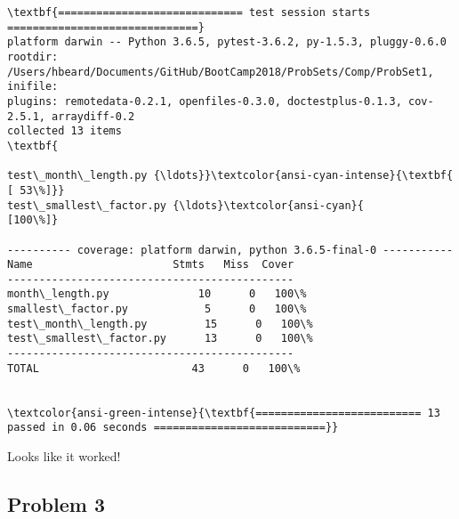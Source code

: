 \documentclass[11pt]{article}
\begin{document}
    \begin{Verbatim}[commandchars=\\\{\}]
\textbf{============================= test session starts ==============================}
platform darwin -- Python 3.6.5, pytest-3.6.2, py-1.5.3, pluggy-0.6.0
rootdir: /Users/hbeard/Documents/GitHub/BootCamp2018/ProbSets/Comp/ProbSet1, inifile:
plugins: remotedata-0.2.1, openfiles-0.3.0, doctestplus-0.1.3, cov-2.5.1, arraydiff-0.2
collected 13 items                                                             \textbf{

test\_month\_length.py {\ldots}}\textcolor{ansi-cyan-intense}{\textbf{                                             [ 53\%]}}
test\_smallest\_factor.py {\ldots}\textcolor{ansi-cyan}{                                           [100\%]}

---------- coverage: platform darwin, python 3.6.5-final-0 -----------
Name                      Stmts   Miss  Cover
---------------------------------------------
month\_length.py              10      0   100\%
smallest\_factor.py            5      0   100\%
test\_month\_length.py         15      0   100\%
test\_smallest\_factor.py      13      0   100\%
---------------------------------------------
TOTAL                        43      0   100\%


\textcolor{ansi-green-intense}{\textbf{========================== 13 passed in 0.06 seconds ===========================}}

    \end{Verbatim}

    Looks like it worked!

    \subsection{Problem 3}\label{problem-3}
\end{document}
